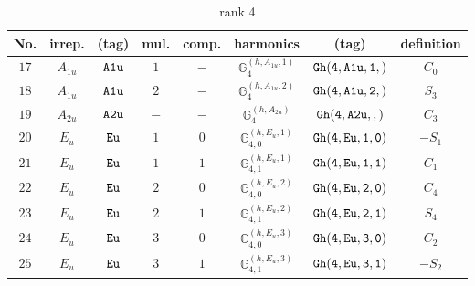 \documentclass[fleqn,8pt]{jsarticle}
\begin{document}
\begin{table}[ht!]
\begin{center}
\caption{rank 4}
\renewcommand{\arraystretch}{1.3}
\begin{tabular}{cccccccc} \hline \hline
No. & irrep. & (tag) & mul. & comp. & harmonics & (tag) & definition \\ \hline
$ 17 $ & $ A_{1u} $ & $ {\tt A1u} $ & $ 1 $ & $ - $ & $ \mathbb{G}_{4}^{(h,A_{1u},1)} $ & $ {\tt Gh(4,A1u,1,)} $ & $ C_{0} $ \\
$ 18 $ & $ A_{1u} $ & $ {\tt A1u} $ & $ 2 $ & $ - $ & $ \mathbb{G}_{4}^{(h,A_{1u},2)} $ & $ {\tt Gh(4,A1u,2,)} $ & $ S_{3} $ \\
$ 19 $ & $ A_{2u} $ & $ {\tt A2u} $ & $ - $ & $ - $ & $ \mathbb{G}_{4}^{(h,A_{2u})} $ & $ {\tt Gh(4,A2u,,)} $ & $ C_{3} $ \\
$ 20 $ & $ E_{u} $ & $ {\tt Eu} $ & $ 1 $ & $ 0 $ & $ \mathbb{G}_{4,0}^{(h,E_{u},1)} $ & $ {\tt Gh(4,Eu,1,0)} $ & $ - S_{1} $ \\
$ 21 $ & $ E_{u} $ & $ {\tt Eu} $ & $ 1 $ & $ 1 $ & $ \mathbb{G}_{4,1}^{(h,E_{u},1)} $ & $ {\tt Gh(4,Eu,1,1)} $ & $ C_{1} $ \\
$ 22 $ & $ E_{u} $ & $ {\tt Eu} $ & $ 2 $ & $ 0 $ & $ \mathbb{G}_{4,0}^{(h,E_{u},2)} $ & $ {\tt Gh(4,Eu,2,0)} $ & $ C_{4} $ \\
$ 23 $ & $ E_{u} $ & $ {\tt Eu} $ & $ 2 $ & $ 1 $ & $ \mathbb{G}_{4,1}^{(h,E_{u},2)} $ & $ {\tt Gh(4,Eu,2,1)} $ & $ S_{4} $ \\
$ 24 $ & $ E_{u} $ & $ {\tt Eu} $ & $ 3 $ & $ 0 $ & $ \mathbb{G}_{4,0}^{(h,E_{u},3)} $ & $ {\tt Gh(4,Eu,3,0)} $ & $ C_{2} $ \\
$ 25 $ & $ E_{u} $ & $ {\tt Eu} $ & $ 3 $ & $ 1 $ & $ \mathbb{G}_{4,1}^{(h,E_{u},3)} $ & $ {\tt Gh(4,Eu,3,1)} $ & $ - S_{2} $ \\
 \hline \hline
\end{tabular}
\end{center}
\end{table}
\end{document}
